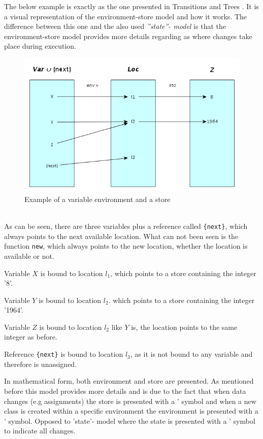 The below example is exactly as the one presented in Transitions and Trees \cite{transtrees}. It is a visual representation of the environment-store model and how it works. The difference between this one and the also used \emph{''state''- model} is that the environment-store model provides more details regarding as where changes take place during execution.
\begin{figure}[!h]
\centering
	\includegraphics[scale=0.55]{img/envstore.png}
	\caption{Example of a variable environment and a store \cite{transtrees}}
\end{figure}\\
As can be seen, there are three variables plus a reference called \texttt{\{next\}}, which always points to the next available location. What can not been seen is the function \texttt{new}, which always points to the new location, whether the location is available or not. 
\begin{description}
\item Variable $X$ is bound to location $l_1$, which points to a store containing the integer '8'.
\item Variable $Y$ is bound to location $l_2$. which points to a store containing the integer '1964'.
\item Variable $Z$ is bound to location $l_2$ like $Y$ is, the location points to the same integer as before.
\item Reference \texttt{\{next\}} is bound to location $l_3$, as it is not bound to any variable and therefore is unassigned.
\end{description}
In mathematical form, both environment and store are presented. As mentioned before this model provides more details and is due to the fact that when data changes (e.g assignments) the store is presented with a ' symbol and when a new class is created within a specific environment the environment is presented with a ' symbol. Opposed to 'state'- model where the state is presented with a ' symbol to indicate all changes.